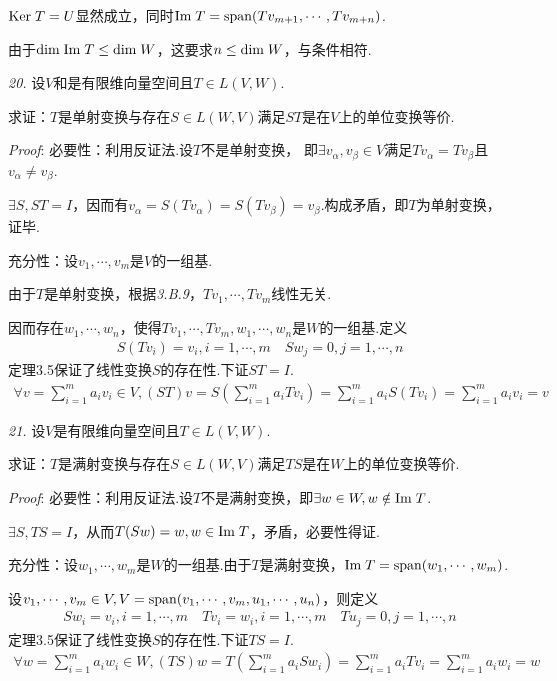 \(\mathrm{Ker \;} T=U\)显然成立，同时\(\mathrm{Im \;} T=\mathrm{span} (Tv_{m+1},\cdots,Tv_{m+n})\).

由于\(\mathrm{dim \;} \mathrm{Im \;} T\leq \mathrm{dim \;} W\)，这要求\(n\leq \mathrm{dim \;} W\)，与条件相符.

\hspace*{\fill}

\textit{20.}
设\(V\)和是有限维向量空间且\(T\in L(V,W)\).

求证：\(T\)是单射变换与存在\(S\in L(W,V)\)满足\(ST\)是在\(V\)上的单位变换等价.

\textit{Proof}:
必要性：利用反证法.设\(T\)不是单射变换，
即\(\exists v_\alpha,v_\beta \in V\)满足\(Tv_\alpha=Tv_\beta\)且\(v_\alpha \ne v_\beta\).

\(\exists S,ST=I\)，因而有\(v_\alpha=S(Tv_\alpha)=S(Tv_\beta)=v_\beta\).构成矛盾，即\(T\)为单射变换，证毕.

充分性：设\(v_1,\cdots,v_m\)是\(V\)的一组基.

由于\(T\)是单射变换，根据\textit{3.B.9}，\(Tv_1,\cdots,Tv_m\)线性无关.

因而存在\(w_1,\cdots,w_n\)，使得\(Tv_1,\cdots,Tv_m,w_1,\cdots,w_n\)是\(W\)的一组基.定义
    \begin{align*}
        S(Tv_i)=v_i,i=1,\cdots,m \quad Sw_j=0,j=1,\cdots,n
    \end{align*}
定理3.5保证了线性变换\(S\)的存在性.下证\(ST=I\).
    \begin{align*}
        \forall v=\sum_{i=1}^m a_iv_i\in V,(ST)v=S(\sum_{i=1}^m a_iTv_i)
        =\sum_{i=1}^m a_iS(Tv_i)=\sum_{i=1}^m a_iv_i=v
    \end{align*}

\newpage

\textit{21.}
设\(V\)是有限维向量空间且\(T\in L(V,W)\).

求证：\(T\)是满射变换与存在\(S\in L(W,V)\)满足\(TS\)是在\(W\)上的单位变换等价.

\textit{Proof}:
必要性：利用反证法.设\(T\)不是满射变换，即\(\exists w\in W,w\notin \mathrm{Im \;} T\).

\(\exists S,TS=I\)，从而\(T(Sw)=w,w\in \mathrm{Im \;} T\)，矛盾，必要性得证.

充分性：设\(w_1,\cdots,w_m\)是\(W\)的一组基.由于\(T\)是满射变换，\(\mathrm{Im \;} T=\mathrm{span} (w_1,\cdots,w_m)\).

设\(v_1,\cdots,v_m\in V,V=\mathrm{span} (v_1,\cdots,v_m,u_1,\cdots,u_n)\)，则定义
    \begin{align*}
        Sw_i=v_i,i=1,\cdots,m \quad
        Tv_i=w_i,i=1,\cdots,m \quad Tu_j=0,j=1,\cdots,n
    \end{align*}
定理3.5保证了线性变换\(S\)的存在性.下证\(TS=I\).
    \begin{align*}
        \forall w=\sum_{i=1}^m a_iw_i\in W,(TS)w=T(\sum_{i=1}^m a_iSw_i) 
        =\sum_{i=1}^m a_iTv_i=\sum_{i=1}^m a_iw_i=w
    \end{align*}

